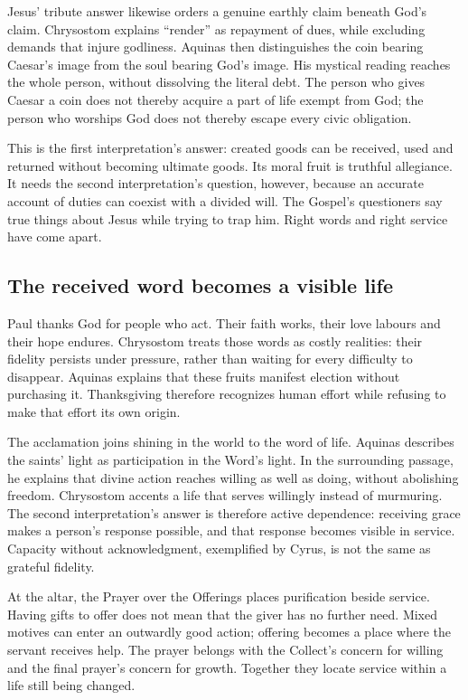 Jesus' tribute answer likewise orders a genuine earthly claim beneath God's claim. Chrysostom explains ``render'' as repayment of dues, while excluding demands that injure godliness. Aquinas then distinguishes the coin bearing Caesar's image from the soul bearing God's image. His mystical reading reaches the whole person, without dissolving the literal debt. The person who gives Caesar a coin does not thereby acquire a part of life exempt from God; the person who worships God does not thereby escape every civic obligation.

This is the first interpretation's answer: created goods can be received, used and returned without becoming ultimate goods. Its moral fruit is truthful allegiance. It needs the second interpretation's question, however, because an accurate account of duties can coexist with a divided will. The Gospel's questioners say true things about Jesus while trying to trap him. Right words and right service have come apart.
\clearpage
\subsection{The received word becomes a visible life}
Paul thanks God for people who act. Their faith works, their love labours and their hope endures. Chrysostom treats those words as costly realities: their fidelity persists under pressure, rather than waiting for every difficulty to disappear. Aquinas explains that these fruits manifest election without purchasing it. Thanksgiving therefore recognizes human effort while refusing to make that effort its own origin.

The acclamation joins shining in the world to the word of life. Aquinas describes the saints' light as participation in the Word's light. In the surrounding passage, he explains that divine action reaches willing as well as doing, without abolishing freedom. Chrysostom accents a life that serves willingly instead of murmuring. The second interpretation's answer is therefore active dependence: receiving grace makes a person's response possible, and that response becomes visible in service. Capacity without acknowledgment, exemplified by Cyrus, is not the same as grateful fidelity.

At the altar, the Prayer over the Offerings places purification beside service. Having gifts to offer does not mean that the giver has no further need. Mixed motives can enter an outwardly good action; offering becomes a place where the servant receives help. The prayer belongs with the Collect's concern for willing and the final prayer's concern for growth. Together they locate service within a life still being changed.


